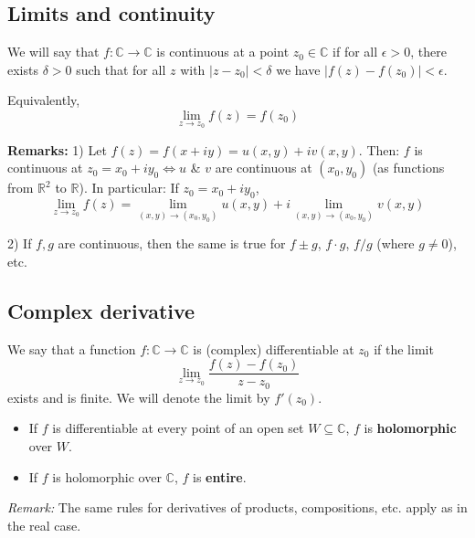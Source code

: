 \subsection{Limits and continuity}

\begin{definition}
We will say that $f: \mathbb{C} \rightarrow \mathbb{C}$ is continuous at a point $z_{0} \in \mathbb{C}$ if for all $\epsilon > 0$, there exists $\delta > 0$ such that for all $z$ with $|z - z_{0}| < \delta$ we have $|f(z) - f(z_{0})| < \epsilon$.

Equivalently,
$$ \lim_{z \rightarrow z_{0}} f(z) = f(z_{0}) $$
\end{definition}

\textbf{Remarks:}
1) Let $f(z) = f(x+iy) = u(x,y) + iv(x,y)$.
Then: $f$ is continuous at $z_{0} = x_{0} + iy_{0} \iff u$ \& $v$ are continuous at $(x_{0}, y_{0})$ (as functions from $\mathbb{R}^{2}$ to $\mathbb{R}$).
In particular: If $z_{0} = x_{0} + iy_{0}$,
$$ \lim_{z \rightarrow z_{0}} f(z) = \lim_{(x,y) \rightarrow (x_{0}, y_{0})} u(x,y) + i \lim_{(x,y) \rightarrow (x_{0}, y_{0})} v(x,y) $$

2) If $f, g$ are continuous, then the same is true for $f \pm g$, $f \cdot g$, $f/g$ (where $g \neq 0$), etc.

\subsection{Complex derivative}

\begin{definition}
We say that a function $f: \mathbb{C} \rightarrow \mathbb{C}$ is (complex) differentiable at $z_0$ if the limit
$$ \lim_{z \rightarrow z_{0}} \frac{f(z) - f(z_{0})}{z - z_{0}} $$
exists and is finite. We will denote the limit by $f'(z_{0})$.

\begin{itemize}
    \item If $f$ is differentiable at every point of an open set $W \subseteq \mathbb{C}$, $f$ is \textbf{holomorphic} over $W$.
    \item If $f$ is holomorphic over $\mathbb{C}$, $f$ is \textbf{entire}.
\end{itemize}
\end{definition}

\textit{Remark:} The same rules for derivatives of products, compositions, etc. apply as in the real case.

